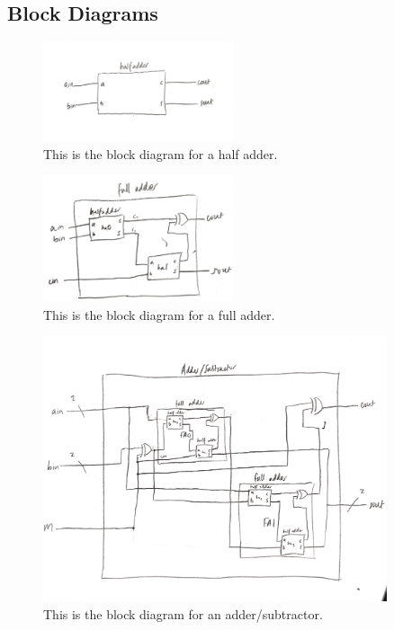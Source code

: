 \documentclass[11pt]{article}
\begin{document}
\subsection*{Block Diagrams}
\begin{figure}[ht]\centering
\includegraphics[width=0.5\textwidth]{lab05_halfadder_block}
\caption{This is the block diagram for a half adder.}
\label{fig:original_logo}
\end{figure}
\begin{figure}[ht]\centering
	\includegraphics[width=0.5\textwidth]{lab05_fulladder_block}
	\caption{This is the block diagram for a full adder.}
	\label{fig:original_logo}
\end{figure}
\begin{figure}[ht]\centering
	\includegraphics[width=0.9\textwidth]{lab05_addsub_block}
	\caption{This is the block diagram for an adder/subtractor.}
	\label{fig:original_logo}
\end{figure}
\end{document}
